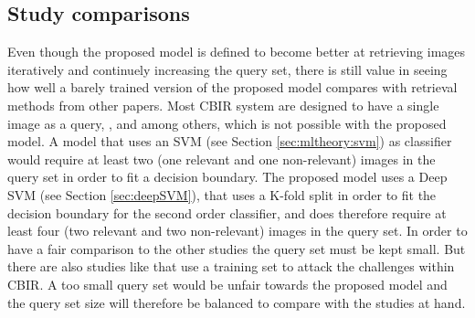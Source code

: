 \subsection{Study comparisons}
\label{sec:meth:eval:studycomp}

Even though the proposed model is defined to become better at retrieving images iteratively and continuely increasing the query set, there is still value in seeing how well a barely trained version of the proposed model compares with retrieval methods from other papers. Most CBIR system are designed to have a single image as a query, \cite{wang2001simplicity}, \cite{subrahmanyam2013modified} and \cite{nagaraja2015low} among others, which is not possible with the proposed model. A model that uses an SVM (see Section \ref{sec:mltheory:svm}) as classifier would require at least two (one relevant and one non-relevant) images in the query set in order to fit a decision boundary. The proposed model uses a Deep SVM (see Section \ref{sec:deepSVM}), that uses a K-fold split in order to fit the decision boundary for the second order classifier, and does therefore require at least four (two relevant and two non-relevant) images in the query set. In order to have a fair comparison to the other studies the query set must be kept small. But there are also studies like \cite{elalami2014new} that use a training set to attack the challenges within CBIR. A too small query set would be unfair towards the proposed model and the query set size will therefore be balanced to compare with the studies at hand.

